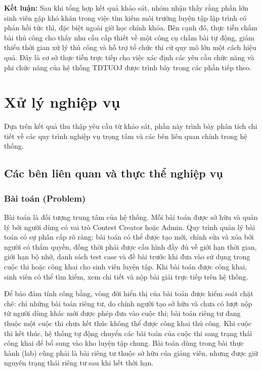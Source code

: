 \documentclass[12pt, a4paper]{report}
\begin{document}
\noindent\textbf{Kết luận:} Sau khi tổng hợp kết quả khảo sát, nhóm
nhận thấy rằng phần lớn sinh viên gặp khó khăn trong việc tìm kiếm môi trường luyện tập
lập trình có phản hồi tức thì, đặc biệt ngoài giờ học chính khóa. Bên cạnh đó, thực tiễn
chấm bài thủ công cho thấy nhu cầu cấp thiết về một công cụ chấm bài tự động, giảm thiểu thời gian xử lý thủ công và hỗ trợ
tổ chức thi cử quy mô lớn một cách hiệu quả. Đây là cơ sở thực tiễn trực tiếp cho việc xác
định các yêu cầu chức năng và phi chức năng của hệ thống TDTUOJ được trình bày trong các
phần tiếp theo.

\section{Xử lý nghiệp vụ}

Dựa trên kết quả thu thập yêu cầu từ khảo sát, phần này trình bày
phân tích chi tiết về các quy trình nghiệp vụ trọng tâm và các bên liên quan chính trong
hệ thống.

\subsection{Các bên liên quan và thực thể nghiệp vụ}

\subsubsection{Bài toán (Problem)}

Bài toán là đối tượng trung tâm của hệ thống. Mỗi bài toán được sở hữu và quản lý bởi
người dùng có vai trò Contest Creator hoặc Admin. Quy trình quản lý bài toán có sự phân
cấp rõ ràng: bài toán có thể được tạo mới, chỉnh sửa và xóa bởi người có thẩm quyền, đồng
thời phải được cấu hình đầy đủ về giới hạn thời gian, giới hạn bộ nhớ, danh sách test case
và đề bài trước khi đưa vào sử dụng trong cuộc thi hoặc công khai cho sinh viên luyện tập.
Khi bài toán được công khai, sinh viên có thể tìm kiếm, xem chi tiết và nộp bài giải trực
tiếp trên hệ thống.

Để bảo đảm tính công bằng, vòng đời hiển thị của bài toán được kiểm soát chặt chẽ: chỉ
những bài toán riêng tư, do chính người tạo sở hữu và chưa có lượt nộp từ người dùng khác
mới được phép đưa vào cuộc thi; bài toán riêng tư đang thuộc một cuộc thi chưa kết thúc
không thể được công khai thủ công. Khi cuộc thi kết thúc, hệ thống tự động chuyển các bài
toán của cuộc thi sang trạng thái công khai để bổ sung vào kho luyện tập chung. Bài toán
dùng trong bài thực hành (lab) cũng phải là bài riêng tư thuộc sở hữu của giảng viên,
nhưng được giữ nguyên trạng thái riêng tư sau khi hết thời hạn.
\end{document}
